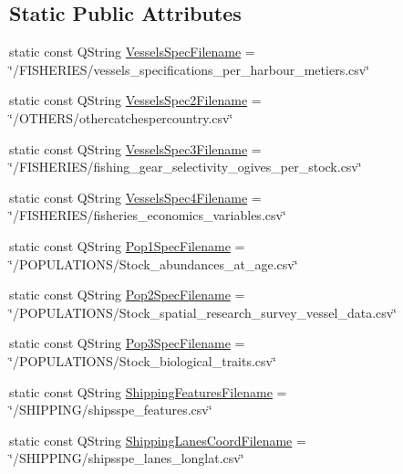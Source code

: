 \subsection*{Static Public Attributes}
\begin{DoxyCompactItemize}
\item 
static const Q\+String \mbox{\hyperlink{class_vessel_editor_main_window_adc764f34f0bdde92d64c81fb1cd14977}{Vessels\+Spec\+Filename}} = \char`\"{}/F\+I\+S\+H\+E\+R\+I\+ES/vessels\+\_\+specifications\+\_\+per\+\_\+harbour\+\_\+metiers.\+csv\char`\"{}
\item 
static const Q\+String \mbox{\hyperlink{class_vessel_editor_main_window_ad4ceac9498fd7af1ad0ede6a368b9de6}{Vessels\+Spec2\+Filename}} = \char`\"{}/O\+T\+H\+E\+RS/othercatchespercountry.\+csv\char`\"{}
\item 
static const Q\+String \mbox{\hyperlink{class_vessel_editor_main_window_aff32b1d94e2006276ea0df4ce17092a0}{Vessels\+Spec3\+Filename}} = \char`\"{}/F\+I\+S\+H\+E\+R\+I\+ES/fishing\+\_\+gear\+\_\+selectivity\+\_\+ogives\+\_\+per\+\_\+stock.\+csv\char`\"{}
\item 
static const Q\+String \mbox{\hyperlink{class_vessel_editor_main_window_a42619f90f899cb1ff112aa97dccd09c0}{Vessels\+Spec4\+Filename}} = \char`\"{}/F\+I\+S\+H\+E\+R\+I\+ES/fisheries\+\_\+economics\+\_\+variables.\+csv\char`\"{}
\item 
static const Q\+String \mbox{\hyperlink{class_vessel_editor_main_window_a832d452fe9206cfdc4f1dd5d89f0ab47}{Pop1\+Spec\+Filename}} = \char`\"{}/P\+O\+P\+U\+L\+A\+T\+I\+O\+NS/Stock\+\_\+abundances\+\_\+at\+\_\+age.\+csv\char`\"{}
\item 
static const Q\+String \mbox{\hyperlink{class_vessel_editor_main_window_a7b66ca2192da858d7507615ffd3f6614}{Pop2\+Spec\+Filename}} = \char`\"{}/P\+O\+P\+U\+L\+A\+T\+I\+O\+NS/Stock\+\_\+spatial\+\_\+research\+\_\+survey\+\_\+vessel\+\_\+data.\+csv\char`\"{}
\item 
static const Q\+String \mbox{\hyperlink{class_vessel_editor_main_window_afc9c1821618cb4aa2972f6c834ea62f2}{Pop3\+Spec\+Filename}} = \char`\"{}/P\+O\+P\+U\+L\+A\+T\+I\+O\+NS/Stock\+\_\+biological\+\_\+traits.\+csv\char`\"{}
\item 
static const Q\+String \mbox{\hyperlink{class_vessel_editor_main_window_adba1de5d4e293f9c5aa2b6c35998aa77}{Shipping\+Features\+Filename}} = \char`\"{}/S\+H\+I\+P\+P\+I\+NG/shipsspe\+\_\+features.\+csv\char`\"{}
\item 
static const Q\+String \mbox{\hyperlink{class_vessel_editor_main_window_a7149af999ec23f1d78da727bef38425b}{Shipping\+Lanes\+Coord\+Filename}} = \char`\"{}/S\+H\+I\+P\+P\+I\+NG/shipsspe\+\_\+lanes\+\_\+longlat.\+csv\char`\"{}

\end{DoxyCompactItemize}
